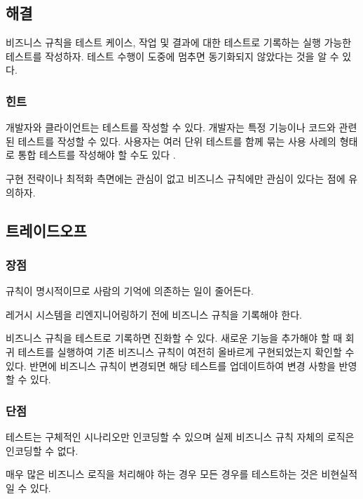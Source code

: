 \documentclass[a4paper,10pt,twoside]{book}
\begin{document}
\subsection*{해결}

비즈니스 규칙을 테스트 케이스, 작업 및 결과에 대한 테스트로 기록하는 실행 가능한 테스트를 작성하자. 테스트 수행이 도중에 멈추면 동기화되지 않았다는 것을 알 수 있다.

\subsubsection*{힌트}

\begin{bulletlist}
\item 개발자와 클라이언트는 테스트를 작성할 수 있다. 개발자는 특정 기능이나 코드와 관련된 테스트를 작성할 수 있다. 사용자는 여러 단위 테스트를 함께 묶는 사용 사례의 형태로 통합 테스트를 작성해야 할 수도 있다 \cite{Davi95a} \cite{Beck00a}. 
\item 구현 전략이나 최적화 측면에는 관심이 없고 비즈니스 규칙에만 관심이 있다는 점에 유의하자. 
\end{bulletlist}

\subsection*{트레이드오프}

\subsubsection*{장점}

\begin{bulletlist}
\item 규칙이 명시적이므로 사람의 기억에 의존하는 일이 줄어든다.
\item 레거시 시스템을 리엔지니어링하기 전에 비즈니스 규칙을 기록해야 한다.
\item 비즈니스 규칙을 테스트로 기록하면 진화할 수 있다. 새로운 기능을 추가해야 할 때 회귀 테스트를 실행하여 기존 비즈니스 규칙이 여전히 올바르게 구현되었는지 확인할 수 있다. 반면에 비즈니스 규칙이 변경되면 해당 테스트를 업데이트하여 변경 사항을 반영할 수 있다.
\end{bulletlist}

\subsubsection*{단점}

\begin{bulletlist}
\item 테스트는 구체적인 시나리오만 인코딩할 수 있으며 실제 비즈니스 규칙 자체의 로직은 인코딩할 수 없다.
\item 매우 많은 비즈니스 로직을 처리해야 하는 경우 모든 경우를 테스트하는 것은 비현실적일 수 있다.
\end{bulletlist}
\end{document}
